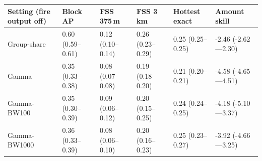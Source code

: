 \begin{tabular}{llllll}
\toprule
Setting (fire output off) & Block AP & FSS 375\,m & FSS 3\,km & Hottest exact & Amount skill \\
\midrule
Group-share & 0.60 (0.59--0.61) & 0.12 (0.10--0.14) & 0.26 (0.23--0.29) & 0.25 (0.25--0.25) & -2.46 (-2.62---2.30) \\
Gamma & 0.35 (0.33--0.38) & 0.08 (0.07--0.08) & 0.19 (0.18--0.20) & 0.21 (0.20--0.21) & -4.58 (-4.65---4.51) \\
Gamma-BW100 & 0.35 (0.30--0.39) & 0.09 (0.06--0.12) & 0.20 (0.15--0.25) & 0.24 (0.24--0.25) & -4.18 (-5.10---3.37) \\
Gamma-BW1000 & 0.36 (0.33--0.39) & 0.08 (0.06--0.10) & 0.20 (0.16--0.23) & 0.25 (0.23--0.27) & -3.92 (-4.66---3.25) \\
\bottomrule
\end{tabular}
